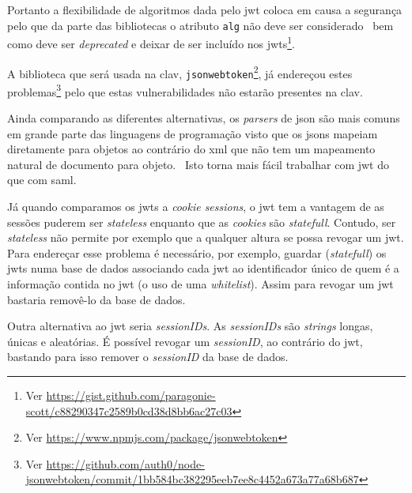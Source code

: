 Portanto a flexibilidade de algoritmos dada pelo \acrshort{jwt} coloca em causa a segurança pelo que da parte das 
bibliotecas o atributo \texttt{alg} não deve ser considerado~\cite{jwtvuln} bem como deve ser \textit{deprecated} 
e deixar de ser incluído nos 
\acrshort{jwt}s\footnote{Ver \url{https://gist.github.com/paragonie-scott/c88290347c2589b0cd38d8bb6ac27c03}}. 

A biblioteca que será usada na \acrshort{clav}, 
\texttt{jsonwebtoken}\footnote{Ver \url{https://www.npmjs.com/package/jsonwebtoken}}, já endereçou estes 
problemas\footnote{Ver \url{https://github.com/auth0/node-jsonwebtoken/commit/1bb584bc382295eeb7ee8c4452a673a77a68b687}} 
pelo que estas vulnerabilidades não estarão presentes na \acrshort{clav}.

Ainda comparando as diferentes alternativas, os \textit{parsers} de \acrshort{json} são mais comuns em grande 
parte das linguagens de programação visto que os \acrshort{json}s mapeiam diretamente para objetos ao contrário 
do \acrshort{xml} que não tem um mapeamento natural de documento para objeto.~\cite{jwtio} 
Isto torna mais fácil trabalhar com \acrshort{jwt} do que com \acrshort{saml}.

Já quando comparamos os \acrshort{jwt}s a \textit{cookie sessions}, o \acrshort{jwt} tem a vantagem de as sessões 
puderem ser \textit{stateless} enquanto que as \textit{cookies} são \textit{statefull}. Contudo, 
ser \textit{stateless} não permite por exemplo que a qualquer altura se possa revogar um \acrshort{jwt}. 
Para endereçar esse problema é necessário, por exemplo, guardar (\textit{statefull}) os \acrshort{jwt}s numa base 
de dados associando cada \acrshort{jwt} ao identificador único de quem é a informação contida no \acrshort{jwt} 
(o uso de uma \textit{whitelist}). Assim para revogar um \acrshort{jwt} bastaria removê-lo da base de dados.

Outra alternativa ao \acrshort{jwt} seria \textit{sessionIDs}. As \textit{sessionIDs} são \textit{strings} longas, 
únicas e aleatórias. É possível revogar um \textit{sessionID}, ao contrário do \acrshort{jwt}, bastando para isso 
remover o \textit{sessionID} da base de dados.

